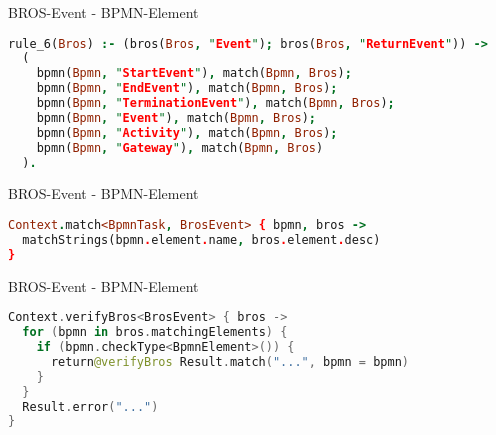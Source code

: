 \begin{frame}[fragile]{BROS-Event - BPMN-Element}
\begin{lstlisting}[language=Prolog]
rule_6(Bros) :- (bros(Bros, "Event"); bros(Bros, "ReturnEvent")) ->
  (
    bpmn(Bpmn, "StartEvent"), match(Bpmn, Bros);
    bpmn(Bpmn, "EndEvent"), match(Bpmn, Bros);
    bpmn(Bpmn, "TerminationEvent"), match(Bpmn, Bros);
    bpmn(Bpmn, "Event"), match(Bpmn, Bros);
    bpmn(Bpmn, "Activity"), match(Bpmn, Bros);
    bpmn(Bpmn, "Gateway"), match(Bpmn, Bros)
  ).
\end{lstlisting}
\end{frame}

\begin{frame}[fragile]{BROS-Event - BPMN-Element}
\begin{lstlisting}[language=Prolog]
Context.match<BpmnTask, BrosEvent> { bpmn, bros ->
  matchStrings(bpmn.element.name, bros.element.desc)
}
\end{lstlisting}
\end{frame}

\begin{frame}[fragile]{BROS-Event - BPMN-Element}
\begin{lstlisting}[language=Kotlin]
Context.verifyBros<BrosEvent> { bros ->
  for (bpmn in bros.matchingElements) {
    if (bpmn.checkType<BpmnElement>()) {
      return@verifyBros Result.match("...", bpmn = bpmn)
    }
  }
  Result.error("...")
}
\end{lstlisting}
\end{frame}